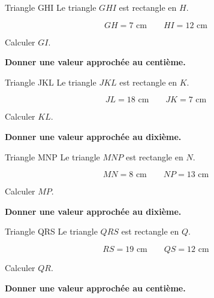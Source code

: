 \documentclass[11pt,a4paper]{article}
\begin{document}
\vspace{3mm}


\noindent
\begin{minipage}[t]{0.485\linewidth}

\begin{exercicebox}{Triangle GHI}
Le triangle \(GHI\) est rectangle en \(H\).

\[
GH=7\text{ cm}
\qquad
HI=12\text{ cm}
\]

Calculer \(GI\).

\textbf{Donner une valeur approchée au centième.}
\end{exercicebox}

\end{minipage}
\hfill
\begin{minipage}[t]{0.485\linewidth}

\begin{exercicebox}{Triangle JKL}
Le triangle \(JKL\) est rectangle en \(K\).

\[
JL=18\text{ cm}
\qquad
JK=7\text{ cm}
\]

Calculer \(KL\).

\textbf{Donner une valeur approchée au dixième.}
\end{exercicebox}

\end{minipage}

\vspace{3mm}


\noindent
\begin{minipage}[t]{0.485\linewidth}

\begin{exercicebox}{Triangle MNP}
Le triangle \(MNP\) est rectangle en \(N\).

\[
MN=8\text{ cm}
\qquad
NP=13\text{ cm}
\]

Calculer \(MP\).

\textbf{Donner une valeur approchée au dixième.}
\end{exercicebox}

\end{minipage}
\hfill
\begin{minipage}[t]{0.485\linewidth}

\begin{exercicebox}{Triangle QRS}
Le triangle \(QRS\) est rectangle en \(Q\).

\[
RS=19\text{ cm}
\qquad
QS=12\text{ cm}
\]

Calculer \(QR\).

\textbf{Donner une valeur approchée au centième.}
\end{exercicebox}

\end{minipage}
\end{document}
